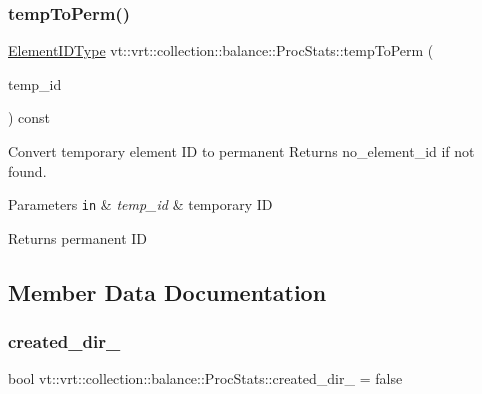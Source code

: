\subsubsection{\texorpdfstring{temp\+To\+Perm()}{tempToPerm()}}
{\footnotesize\ttfamily \hyperlink{namespacevt_1_1vrt_1_1collection_1_1balance_a14c8d2c972f2913aa3f1636e5be0a120}{Element\+I\+D\+Type} vt\+::vrt\+::collection\+::balance\+::\+Proc\+Stats\+::temp\+To\+Perm (\begin{DoxyParamCaption}\item[{\hyperlink{namespacevt_1_1vrt_1_1collection_1_1balance_a14c8d2c972f2913aa3f1636e5be0a120}{Element\+I\+D\+Type}}]{temp\+\_\+id }\end{DoxyParamCaption}) const}



Convert temporary element ID to permanent Returns {\ttfamily no\+\_\+element\+\_\+id} if not found. 


\begin{DoxyParams}[1]{Parameters}
\mbox{\tt in}  & {\em temp\+\_\+id} & temporary ID\\
\hline
\end{DoxyParams}
\begin{DoxyReturn}{Returns}
permanent ID 
\end{DoxyReturn}


\subsection{Member Data Documentation}
\mbox{\label{structvt_1_1vrt_1_1collection_1_1balance_1_1_proc_stats_a44e4994b863721b1a20bcd2333a1966b}} 
\subsubsection{\texorpdfstring{created\+\_\+dir\+\_\+}{created\_dir\_}}
{\footnotesize\ttfamily bool vt\+::vrt\+::collection\+::balance\+::\+Proc\+Stats\+::created\+\_\+dir\+\_\+ = false\hspace{0.3cm}{\ttfamily [private]}}



